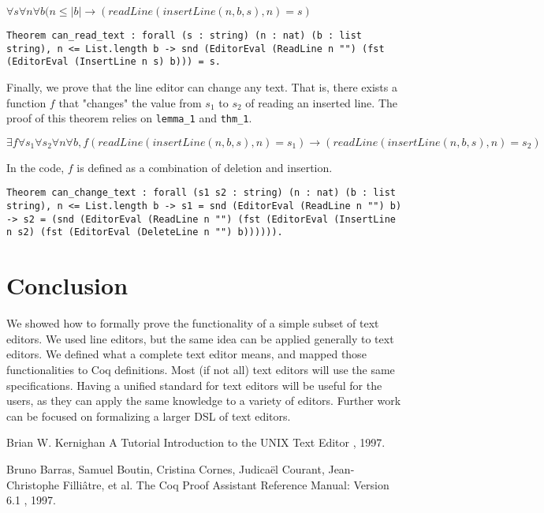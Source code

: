 \documentclass{article}
\theoremstyle{definition}
\begin{document}
\begin{center}
\(\forall s \forall n \forall b (n \leq |b| \to (readLine(insertLine( n, b, s ), n) = s)\)
\end{center}

\begin{lstlisting}
Theorem can_read_text : forall (s : string) (n : nat) (b : list string), n <= List.length b -> snd (EditorEval (ReadLine n "") (fst (EditorEval (InsertLine n s) b))) = s.
\end{lstlisting}


Finally, we prove that the line editor can change any text. That is, there exists a function \(f\) that "changes" the value from \(s_1\) to \(s_2\) of reading an inserted line. The proof of this theorem relies on \texttt{lemma\_1} and \texttt{thm\_1}.

\begin{center}
\(\exists f \forall s_1 \forall s_2 \forall n \forall b, f(readLine(insertLine( n, b, s ), n) = s_1) \to (readLine(insertLine( n, b, s ), n) = s_2)\)
\end{center}

In the code, \(f\) is defined as a combination of deletion and insertion.

\begin{lstlisting}
Theorem can_change_text : forall (s1 s2 : string) (n : nat) (b : list string), n <= List.length b -> s1 = snd (EditorEval (ReadLine n "") b) -> s2 = (snd (EditorEval (ReadLine n "") (fst (EditorEval (InsertLine n s2) (fst (EditorEval (DeleteLine n "") b)))))).
\end{lstlisting}

\section{Conclusion}
We showed how to formally prove the functionality of a simple subset of text editors. We used line editors, but the same idea can be applied generally to text editors. We defined what a complete text editor means, and mapped those functionalities to Coq definitions. Most (if not all) text editors will use the same specifications. Having a unified standard for text editors will be useful for the users, as they can apply the same knowledge to a variety of editors. Further work can be focused on formalizing a larger DSL of text editors.

\begin{thebibliography}{1}

Brian W. Kernighan
\newblock A Tutorial Introduction to the UNIX Text Editor
, 1997.

Bruno Barras, Samuel Boutin, Cristina Cornes, Judicaël Courant, Jean-Christophe Filliâtre, et al.
\newblock The Coq Proof Assistant Reference Manual: Version 6.1
, 1997.

\end{thebibliography}
\end{document}
